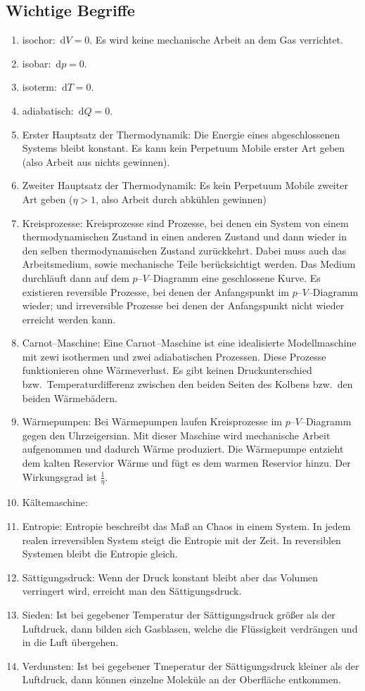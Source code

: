\documentclass[a4paper,12pt]{article}
\newcommand{\td}{\,\text{d}}
\numberwithin{equation}{section}
\begin{document}
\subsection{Wichtige Begriffe}
\begin{enumerate}[label=$\circ$]
        \item isochor: $\td V=0$. Es wird keine mechanische Arbeit an dem Gas verrichtet.
        \item isobar: $\td p=0$.
        \item isoterm: $\td T=0$.
        \item adiabatisch: $\td Q=0$.
        \item Erster Hauptsatz der Thermodynamik: Die Energie eines abgeschlossenen Systems bleibt konstant. Es kann kein Perpetuum Mobile erster Art geben (also Arbeit aus nichts gewinnen).
        \item Zweiter Hauptsatz der Thermodynamik: Es kein Perpetuum Mobile zweiter Art geben ($\eta >1$, also Arbeit durch abkühlen gewinnen)
        \item Kreisprozesse: Kreisprozesse sind Prozesse, bei denen ein System von einem thermodynamischen Zustand in einen anderen Zustand und dann wieder in den selben thermodynamischen Zustand zurückkehrt. Dabei muss auch das Arbeitsmedium, sowie mechanische Teile berücksichtigt werden. Das Medium durchläuft dann auf dem $p$--$V$--Diagramm eine geschlossene Kurve. Es existieren reversible Prozesse, bei denen der Anfangspunkt im $p$--$V$--Diagramm wieder; und irreversible Prozesse bei denen der Anfangspunkt nicht wieder erreicht werden kann.
        \item Carnot--Maschine: Eine Carnot--Maschine ist eine idealisierte Modellmaschine mit zewi isothermen und zwei adiabatischen Prozessen. Diese Prozesse funktionieren ohne Wärmeverlust. Es gibt keinen Druckunterschied bzw.\ Temperaturdifferenz zwischen den beiden Seiten des Kolbens bzw.\ den beiden Wärmebädern.
        \item Wärmepumpen: Bei Wärmepumpen laufen Kreisprozesse im $p$--$V$--Diagramm gegen den Uhrzeigersinn. Mit dieser Maschine wird mechanische Arbeit aufgenommen und dadurch Wärme produziert. Die Wärmepumpe entzieht dem kalten Reservior Wärme und fügt es dem warmen Reservior hinzu. Der Wirkungsgrad ist $\tfrac{1}{\eta }$.
        \item Kältemaschine: 
        \item Entropie: Entropie beschreibt das Maß an Chaos in einem System. In jedem realen irreversiblen System steigt die Entropie mit der Zeit. In reversiblen Systemen bleibt die Entropie gleich.
        \item Sättigungsdruck: Wenn der Druck konstant bleibt aber das Volumen verringert wird, erreicht man den Sättigungsdruck.
        \item Sieden: Ist bei gegebener Temperatur der Sättigungsdruck größer als der Luftdruck, dann bilden sich Gasblasen, welche die Flüssigkeit verdrängen und in die Luft übergehen.
        \item Verdunsten: Ist bei gegebener Tmeperatur der Sättigungsdruck kleiner als der Luftdruck, dann können einzelne Moleküle an der Oberfläche entkommen.
\end{enumerate}
\end{document}
